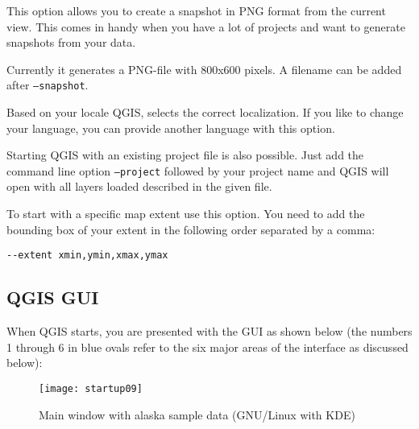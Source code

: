 \begin{Tip} \caption{\textsc{Example Using command line arguments}}
\end{Tip}

This option allows you to create a snapshot in PNG format from the current view.
This comes in handy when you have a lot of projects and want to 
generate snapshots from your data.

Currently it generates a PNG-file with 800x600 pixels. A filename can be added after
\texttt{---snapshot}.

Based on your locale QGIS, selects the correct localization. If you like to 
change your language, you can provide another language with this option.

Starting QGIS with an existing project file is also possible. Just
add the command line option \texttt{--project} followed by your project name
and QGIS will open with all layers loaded described in the given file.

To start with a specific map extent use this option. You need to add the bounding
box of your extent in the following order separated by a comma:
\begin{verbatim}
--extent xmin,ymin,xmax,ymax
\end{verbatim}


\subsection{QGIS GUI}
\label{label_qgismainwindow}

When QGIS starts, you are presented with the GUI as shown below
(the numbers 1 through 6 in blue ovals refer to the six major areas of the
interface as discussed below):

\begin{figure}[ht]
   \begin{center}
   \caption{Main window with alaska sample data (GNU/Linux with KDE)}\label{fig:startup}
   \texttt{[image: startup09]}
\end{center} 
\end{figure}

